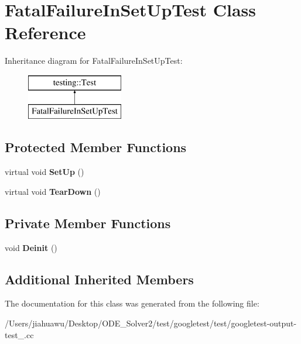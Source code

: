 \hypertarget{class_fatal_failure_in_set_up_test}{}\section{Fatal\+Failure\+In\+Set\+Up\+Test Class Reference}
\label{class_fatal_failure_in_set_up_test}
Inheritance diagram for Fatal\+Failure\+In\+Set\+Up\+Test\+:\begin{figure}[H]
\begin{center}
\leavevmode
\includegraphics[height=2.000000cm]{class_fatal_failure_in_set_up_test}
\end{center}
\end{figure}
\subsection*{Protected Member Functions}
\begin{DoxyCompactItemize}
\item 
\mbox{\label{class_fatal_failure_in_set_up_test_a455696f86fb5f5393624221ccb79b373}} 
virtual void {\bfseries Set\+Up} ()
\item 
\mbox{\label{class_fatal_failure_in_set_up_test_a457707161063e08f7b6600ec5db449e4}} 
virtual void {\bfseries Tear\+Down} ()
\end{DoxyCompactItemize}
\subsection*{Private Member Functions}
\begin{DoxyCompactItemize}
\item 
\mbox{\label{class_fatal_failure_in_set_up_test_a15b9ce9af7b34582b95871af4f8a97a4}} 
void {\bfseries Deinit} ()
\end{DoxyCompactItemize}
\subsection*{Additional Inherited Members}


The documentation for this class was generated from the following file\+:\begin{DoxyCompactItemize}
\item 
/\+Users/jiahuawu/\+Desktop/\+O\+D\+E\+\_\+\+Solver2/test/googletest/test/googletest-\/output-\/test\+\_\+.\+cc\end{DoxyCompactItemize}
